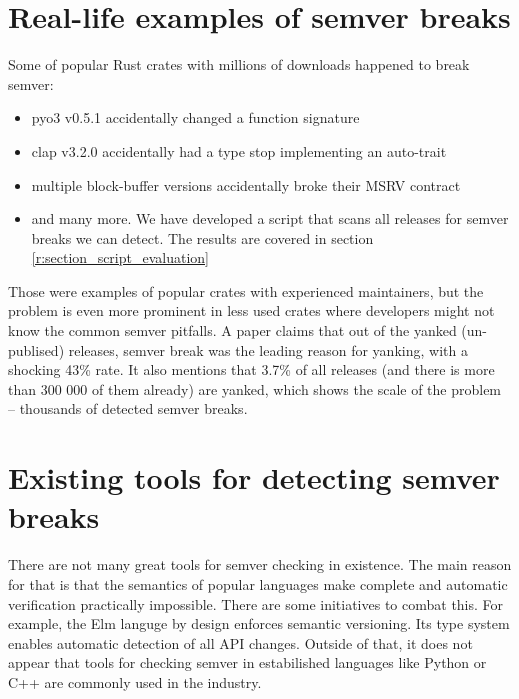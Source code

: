 \documentclass[licencjacka,en]{pracamgr}
\begin{document}
\section{Real-life examples of semver breaks} \label{r:section_real_life_semver_breaks}

Some of popular Rust crates with millions of downloads happened to break semver:
\begin{itemize}
    \item {\ttfamily pyo3 v0.5.1} accidentally changed a function signature \cite{pyo3-issue}
    \item {\ttfamily clap v3.2.0} accidentally had a type stop implementing an auto-trait
		\cite{clap-issue}
    \item multiple {\ttfamily block-buffer} versions accidentally broke their MSRV contract
		\cite{block-buffer-issue}
    \item and many more. We have developed a script that scans all releases for semver breaks we
		can detect. The results are covered in section \ref{r:section_script_evaluation}
\end{itemize}

Those were examples of popular crates with experienced maintainers, but the problem is even more
prominent in less used crates where developers might not know the common semver pitfalls. A paper
\cite{paper} claims that out of the yanked (un-publised) releases, semver break was the leading
reason for yanking, with a shocking 43\% rate. It also mentions that 3.7\% of all releases
(and there is more than 300 000 of them already) are yanked, which shows the scale of the problem
-- thousands of detected semver breaks.

\section{Existing tools for detecting semver breaks}\label{r:section_existing_semver_tools}

There are not many great tools for semver checking in existence. The main reason for that is that
the semantics of popular languages make complete and automatic verification practically impossible.
There are some initiatives to combat this. For example, the Elm languge\cite{elm-lang} by design
enforces semantic versioning. Its type system enables automatic detection of all API changes.
Outside of that, it does not appear that tools for checking semver in estabilished languages like
Python or C++ are commonly used in the industry.
\end{document}
